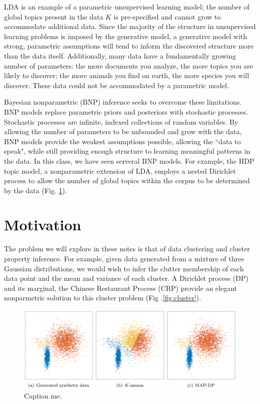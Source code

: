 \documentclass[twoside]{article}
\begin{document}
LDA is an example of a parametric unsupervised learning model; the number of global topics present in the data $K$ is pre-specified and cannot grow to accommodate additional data. Since the majority of the structure in unsupervised learning problems is imposed by the generative model, a generative model with strong, parametric assumptions will tend to inform the discovered structure more than the data itself. Additionally, many data have a fundamentally growing number of parameters: the more documents you analyze, the more topics you are likely to discover; the more animals you find on earth, the more species you will discover. These data could not be accommodated by a parametric model.

Bayesian nonparametric (BNP) inference seeks to overcome these limitations.  BNP models replace parametric priors and posteriors with stochastic processes. Stochastic processes are infinite, indexed collections of random variables. By allowing the number of parameters to be unbounded and grow with the data, BNP models provide the weakest assumptions possible, allowing the ``data to speak", while still providing enough structure to learning meaningful patterns in the data. In this class, we have seen serveral BNP models. For example, the HDP topic model, a nonparametric extension of LDA, employs a nested Dirichlet process to allow the number of global topics within the corpus to be determined by the data (Fig. \ref{fig:graph}). 

\section{Motivation}
The problem we will explore in these notes is that of data clustering and cluster property inference. For example, given data generated from a mixture of three Gaussian distributions, we would wish to infer the clutter membership of each data point and the mean and variance of each cluster. A Dirichlet process (DP) and its marginal, the Chinese Restaurant Process (CRP) provide an elegant nonparmetric solution to this cluster problem (Fig .\ref{fig:cluster}). 

\begin{figure}[h]
  \centering
    \includegraphics[scale=0.35]{cluster}
    \caption{Caption me.\citet{Raykov2016}}
  \label{fig:graph}
\end{figure}
\end{document}

